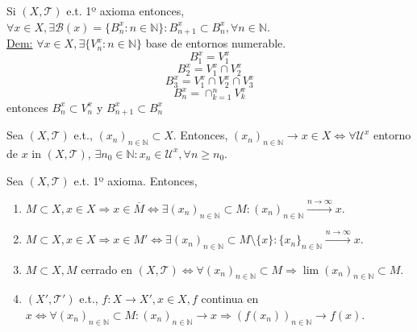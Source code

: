 \begin{obs}
  Si $( X, \mathcal{T} )$ e.t. 1º axioma entonces, $\forall x \in X, \exists \mathcal{B}(x) = \{  B_{n}^{x} : n \in \mathbb{N} \} :  B_{n+1}^{x} \subset B_{n}^{x}, \forall n \in \mathbb{N}$. \\

  \underline{Dem:} $\forall x \in X, \exists \{  V_{n}^{x} : n \in \mathbb{N} \}$ base de entornos numerable. 
  \[ 
    B_{1}^{x} = V_{1}^{x}
  \] 
  \[ 
    B_{2}^{x} = V_{1}^{x} \cap V_{2}^{x}
  \] 
  \[ 
    B_{3}^{x} = V_{1}^{x} \cap V_{2}^{x} \cap V_{3}^{x}
  \] 
  \[ 
    B_{n}^{x} = \cap_{k=1}^{n} V_{k}^{x} 
  \] 
  entonces $B_{n}^{x} \subset V_{n}^{x}$ y $B_{n+1}^{x} \subset B_{n}^{x}$
\end{obs}

\begin{defn}
  Sea $( X, \mathcal{T} )$ e.t., $( x_{n} )_{n \in \mathbb{N}} \subset X$. Entonces, $( x_{n} )_{n \in \mathbb{N}} \rightarrow x \in X \Leftrightarrow \forall \mathcal{U}^{x}$ entorno de $x$ in $( X, \mathcal{T} )$, $\exists n_{0} \in \mathbb{N} : x_{n} \in \mathcal{U}^{x}, \forall n \geq n_{0}$.
\end{defn}

\begin{prop}
  Sea $( X, \mathcal{T} )$ e.t. 1º axioma. Entonces,
  \begin{enumerate}[label=(\roman*)]
    \item $M \subset X, x \in X \Rightarrow x \in \overline{M} \Leftrightarrow \exists ( x_{n} )_{n \in \mathbb{N}} \subset M : ( x_{n} )_{n \in \mathbb{N}} \xrightarrow[]{ n \rightarrow \infty } x$.
    \item $M \subset X, x \in X \Rightarrow x \in M' \Leftrightarrow \exists ( x_{n} )_{n \in \mathbb{N}} \subset M \setminus \{  x \}: \{ x_{n} \}_{n \in \mathbb{N}} \xrightarrow[]{ n \rightarrow \infty } x$.
    \item $M \subset X, M$ cerrado en $( X, \mathcal{T} ) \Leftrightarrow \forall ( x_{n} )_{n \in \mathbb{N}} \subset M \Rightarrow \lim ( x_{n} )_{n \in \mathbb{N}} \subset M$.
    \item $( X', \mathcal{T}' )$ e.t., $f : X \to X', x \in X, f$ continua en $x \Leftrightarrow \forall ( x_{n} )_{n \in \mathbb{N}} \subset M : ( x_{n} )_{n \in \mathbb{N}} \rightarrow x \Rightarrow ( f(x_{n}) )_{n \in \mathbb{N}} \rightarrow f(x)$.
  \end{enumerate}
\end{prop}

